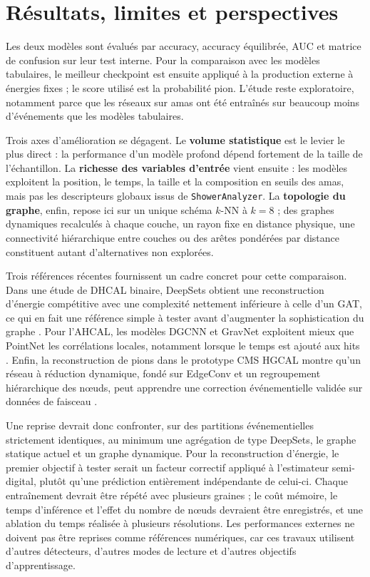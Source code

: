 \section{Résultats, limites et perspectives}

Les deux modèles sont évalués par accuracy, accuracy équilibrée, AUC et matrice de confusion sur leur test interne. Pour la comparaison avec les modèles tabulaires, le meilleur checkpoint est ensuite appliqué à la production externe à énergies fixes ; le score utilisé est la probabilité pion. L'étude reste exploratoire, notamment parce que les réseaux sur amas ont été entraînés sur beaucoup moins d'événements que les modèles tabulaires.

Trois axes d'amélioration se dégagent. Le \textbf{volume statistique} est le levier le plus direct : la performance d'un modèle profond dépend fortement de la taille de l'échantillon. La \textbf{richesse des variables d'entrée} vient ensuite : les modèles exploitent la position, le temps, la taille et la composition en seuils des amas, mais pas les descripteurs globaux issus de \texttt{ShowerAnalyzer}. La \textbf{topologie du graphe}, enfin, repose ici sur un unique schéma \(k\)-NN à \(k=8\) ; des graphes dynamiques recalculés à chaque couche, un rayon fixe en distance physique, une connectivité hiérarchique entre couches ou des arêtes pondérées par distance constituent autant d'alternatives non explorées.

Trois références récentes fournissent un cadre concret pour cette comparaison. Dans une étude de DHCAL binaire, DeepSets obtient une reconstruction d'énergie compétitive avec une complexité nettement inférieure à celle d'un GAT, ce qui en fait une référence simple à tester avant d'augmenter la sophistication du graphe \cite{borysova2025dhcalgnn}. Pour l'AHCAL, les modèles DGCNN et GravNet exploitent mieux que PointNet les corrélations locales, notamment lorsque le temps est ajouté aux hits \cite{calice2024showerseparation}. Enfin, la reconstruction de pions dans le prototype CMS HGCAL montre qu'un réseau à réduction dynamique, fondé sur EdgeConv et un regroupement hiérarchique des nœuds, peut apprendre une correction événementielle validée sur données de faisceau \cite{aamir2024hgcalgnn}.

Une reprise devrait donc confronter, sur des partitions événementielles strictement identiques, au minimum une agrégation de type DeepSets, le graphe statique actuel et un graphe dynamique. Pour la reconstruction d'énergie, le premier objectif à tester serait un facteur correctif appliqué à l'estimateur semi-digital, plutôt qu'une prédiction entièrement indépendante de celui-ci. Chaque entraînement devrait être répété avec plusieurs graines ; le coût mémoire, le temps d'inférence et l'effet du nombre de nœuds devraient être enregistrés, et une ablation du temps réalisée à plusieurs résolutions. Les performances externes ne doivent pas être reprises comme références numériques, car ces travaux utilisent d'autres détecteurs, d'autres modes de lecture et d'autres objectifs d'apprentissage.

